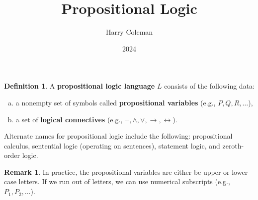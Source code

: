 \documentclass[12pt]{article}
\renewcommand{\maketitle}{\thispagestyle{title}}
\theoremstyle{definition}
\newtheorem{definition}[theorem]{Definition}
\newtheorem{remark}[theorem]{Remark}
\newcommand{\<}{\langle}
\renewcommand{\>}{\rangle}
\newcommand{\keyword}{\textbf}
\begin{document}
\title{Propositional Logic}
\author{Harry Coleman}
\date{2024}
\maketitle

\begin{definition}
    A \keyword{propositional logic language} $L$ consists of the following data:
    \begin{enumerate}[(a)]
        \item a nonempty set of symbols called \keyword{propositional variables} (e.g., $P, Q, R, \dots$),
        \item a set of \keyword{logical connectives} (e.g., $\lnot, \land, \lor, \to, \leftrightarrow$).
    \end{enumerate}
    Alternate names for propositional logic include the following: propositional calculus, sentential logic (operating on sentences), statement logic, and zeroth-order logic.
\end{definition}

\begin{remark}
    In practice, the propositional variables are either be upper or lower case letters.
    If we run out of letters, we can use numerical subscripts (e.g., $P_1, P_2, \dots$).
\end{remark}
\end{document}
